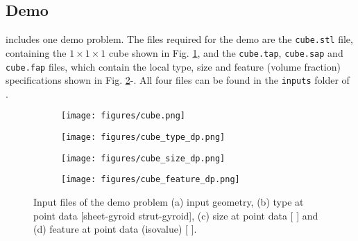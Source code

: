 \subsection{Demo} \label{sec:demo}
\asli{} includes one demo problem. The files required for the demo are the \texttt{cube.stl} file, containing the $1\times1\times1$ cube shown in Fig. \ref{fig:cube}, and the \texttt{cube.tap}, \texttt{cube.sap} and \texttt{cube.fap} files, which contain the local type, size and feature (volume fraction) specifications shown in Fig. \ref{fig:type_dp}-. All four files can be found in the \texttt{inputs} folder of \asli{}.
\begin{figure}[htb]
	\centering
	\begin{subfigure}[t]{.225\textwidth}
		\centering
		\texttt{[image: figures/cube.png]}
		\caption{}\label{fig:cube}
	\end{subfigure}\hspace{1.0em}%
	\begin{subfigure}[t]{.225\textwidth}
		\centering
		\texttt{[image: figures/cube\_type\_dp.png]}
		\caption{}\label{fig:type_dp}
	\end{subfigure}\hspace{1.0em}%
	\begin{subfigure}[t]{.225\textwidth}
		\centering
		\texttt{[image: figures/cube\_size\_dp.png]}
		\caption{}\label{fig:size_dp}
	\end{subfigure}\hspace{1.0em}%
	\begin{subfigure}[t]{.225\textwidth}
		\centering
		\texttt{[image: figures/cube\_feature\_dp.png]}
		\caption{}\label{fig:feature_dp}
	\end{subfigure}%

	\caption{Input files of the demo problem (a) input geometry, (b) type at point data [\mycirc[myColorD] sheet-gyroid \mycirc[myColorA] strut-gyroid], (c) size at point data [ ] and (d) feature at point data (isovalue) [ ].}
	\label{fig:demo}
\end{figure}

